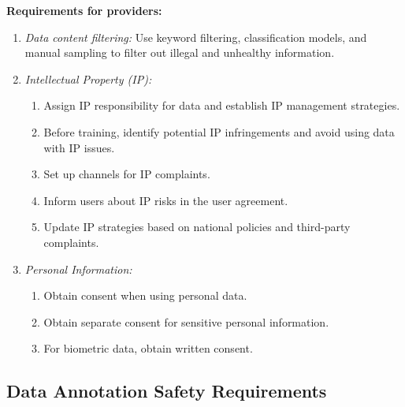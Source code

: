 \documentclass{article}
\begin{document}
\textbf{Requirements for providers:}
\begin{enumerate}
    \item \textit{Data content filtering:} Use keyword filtering, classification models, and manual sampling to filter out illegal and unhealthy information.
    \item \textit{Intellectual Property (IP):}
    \begin{enumerate}
        \item Assign IP responsibility for data and establish IP management strategies.
        \item Before training, identify potential IP infringements and avoid using data with IP issues.
        \item Set up channels for IP complaints.
        \item Inform users about IP risks in the user agreement.
        \item Update IP strategies based on national policies and third-party complaints.
    \end{enumerate}
    \item \textit{Personal Information:}
    \begin{enumerate}
        \item Obtain consent when using personal data.
        \item Obtain separate consent for sensitive personal information.
        \item For biometric data, obtain written consent.
    \end{enumerate}
\end{enumerate}

\subsection{Data Annotation Safety Requirements}
\end{document}

